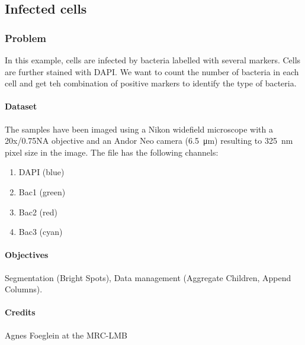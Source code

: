 \subsection{Infected cells}

\subsubsection*{Problem}

In this example, cells are infected by bacteria labelled with several markers. Cells are further stained with DAPI. We want to count the number of bacteria in each cell and get teh combination of positive markers to identify the type of bacteria.


\paragraph{Dataset} 
The samples have been imaged using a Nikon widefield microscope with a 20x/0.75NA objective and an Andor Neo camera (\SI{6.5}{\micro\meter}) resulting to \SI{325}{\nano\meter} pixel size in the image. The file  has the following channels:
\begin{enumerate}
    \item DAPI (blue)
    \item Bac1 (green)
    \item Bac2 (red)
    \item Bac3 (cyan)
\end{enumerate}

\paragraph{Objectives} Segmentation (Bright Spots), Data management (Aggregate Children, Append Columns).

\paragraph{Credits} Agnes Foeglein at the MRC-LMB

